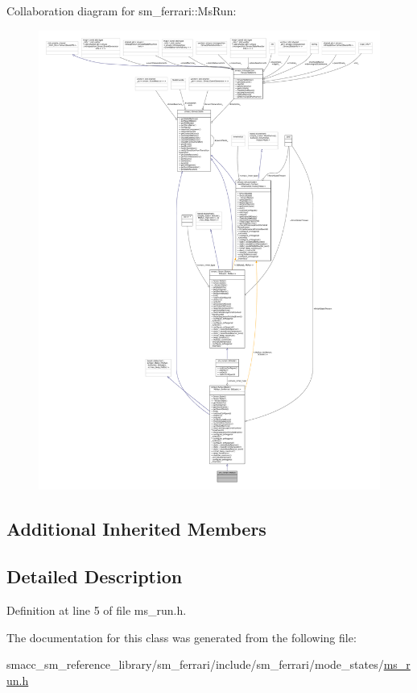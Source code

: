 Collaboration diagram for sm\+\_\+ferrari\+:\+:Ms\+Run\+:
\nopagebreak
\begin{figure}[H]
\begin{center}
\leavevmode
\includegraphics[width=350pt]{classsm__ferrari_1_1MsRun__coll__graph}
\end{center}
\end{figure}
\subsection*{Additional Inherited Members}


\subsection{Detailed Description}


Definition at line 5 of file ms\+\_\+run.\+h.



The documentation for this class was generated from the following file\+:\begin{DoxyCompactItemize}
\item 
smacc\+\_\+sm\+\_\+reference\+\_\+library/sm\+\_\+ferrari/include/sm\+\_\+ferrari/mode\+\_\+states/\hyperlink{sm__ferrari_2include_2sm__ferrari_2mode__states_2ms__run_8h}{ms\+\_\+run.\+h}\end{DoxyCompactItemize}
